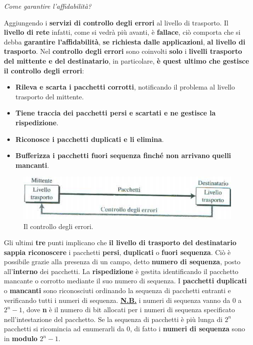 \documentclass[11pt,a4paper,oneside]{book}
\theoremstyle{definition}
\begin{document}
\pagebreak

\begin{flushleft}
	\textit{Come garantire l'affidabilità?}
\end{flushleft}
Aggiungendo i \textbf{servizi di controllo degli errori} al livello di trasporto.
Il \textbf{livello di rete} infatti, come si vedrà più avanti, è \textbf{fallace}, ciò comporta che si debba \textbf{garantire l'affidabilità}, \textbf{se richiesta dalle applicazioni}, \textbf{al livello di trasporto}. Nel \textbf{controllo degli errori} sono coinvolti \textbf{solo} i \textbf{livelli trasporto del mittente e del destinatario}, in particolare, \textbf{è quest ultimo che gestisce il controllo degli errori}:
\begin{itemize}
	\item \textbf{Rileva e scarta i pacchetti corrotti}, notificando il problema al livello trasporto del mittente.
	\item \textbf{Tiene traccia dei pacchetti persi e scartati e ne gestisce la rispedizione}.
	\item \textbf{Riconosce i pacchetti duplicati e li elimina}.
	\item \textbf{Bufferizza i pacchetti fuori sequenza finché non arrivano quelli mancanti}.
\end{itemize}
\begin{figure}[!h]
	\includegraphics[scale=0.5]{Immagini/Error_ctr.png}
	\centering
	\caption{Il controllo degli errori.}
\end{figure}
Gli ultimi \textbf{tre} punti implicano che \textbf{il livello di trasporto del destinatario} \textbf{sappia riconoscere} i pacchetti \textbf{persi}, \textbf{duplicati} o \textbf{fuori sequenza}. Ciò è possibile grazie alla presenza di un campo, detto \textbf{numero di sequenza}, posto all'\textbf{interno} dei pacchetti. La \textbf{rispedizione} è gestita identificando il pacchetto mancante o corrotto mediante il suo numero di sequenza. I \textbf{pacchetti duplicati} o \textbf{mancanti} sono riconosciuti ordinando la sequenza di pacchetti entranti e verificando tutti i numeri di sequenza.\newline
\underline{\textbf{N.B.}} i numeri di sequenza vanno da 0 a $2^n - 1$, dove \textbf{n} è il numero di bit allocati per i numeri di sequenza specificato nell'intestazione del pacchetto. Se la sequenza di pacchetti è più lunga di $2^n$ pacchetti si ricomincia ad enumerarli da 0, di fatto i \textbf{numeri di sequenza} sono in \textbf{modulo} $2^n - 1$.
\end{document}
